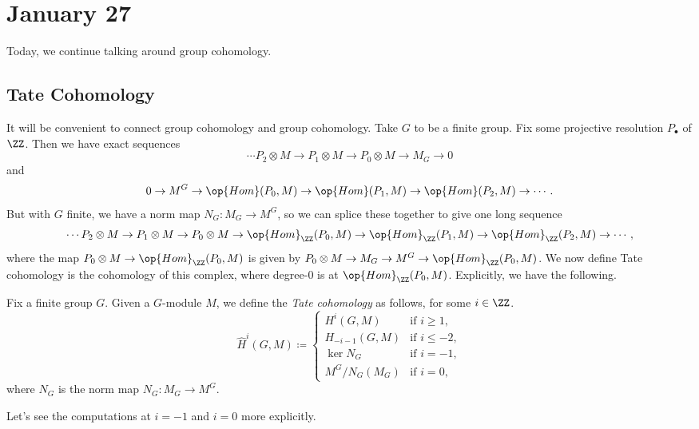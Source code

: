 \documentclass[../notes.tex]{subfiles}
\begin{document}
\section{January 27}

Today, we continue talking around group cohomology.

\subsection{Tate Cohomology}
It will be convenient to connect group cohomology and group cohomology. Take $G$ to be a finite group. Fix some projective resolution $P_\bullet$ of $\ZZ$. Then we have exact sequences
\[\cdots P_2\otimes M\to P_1\otimes M\to P_0\otimes M\to M_G\to0\]
and
\[0\to M^G\to\op{Hom}(P_0,M)\to\op{Hom}(P_1,M)\to\op{Hom}(P_2,M)\to\cdots.\]
But with $G$ finite, we have a norm map $N_G\colon M_G\to M^G$, so we can splice these together to give one long sequence
\[\cdots P_2\otimes M\to P_1\otimes M\to P_0\otimes M\to\op{Hom}_\ZZ(P_0,M)\to\op{Hom}_\ZZ(P_1,M)\to\op{Hom}_\ZZ(P_2,M)\to\cdots,\]
where the map $P_0\otimes M\to\op{Hom}_\ZZ(P_0,M)$ is given by $P_0\otimes M\to M_G\to M^G\to\op{Hom}_\ZZ(P_0,M)$. We now define Tate cohomology is the cohomology of this complex, where degree-$0$ is at $\op{Hom}_\ZZ(P_0,M)$. Explicitly, we have the following.
\begin{definition}
	Fix a finite group $G$. Given a $G$-module $M$, we define the \textit{Tate cohomology} as follows, for some $i\in\ZZ$.
	\[\widehat H^i(G,M)\coloneqq\begin{cases}
		H^i(G,M) & \text{if }i\ge1, \\
		H_{-i-1}(G,M) & \text{if }i\le-2, \\
		\ker N_G & \text{if }i=-1, \\
		M^G/N_G(M_G) & \text{if }i=0,
	\end{cases}\]
	where $N_G$ is the norm map $N_G\colon M_G\to M^G$.
\end{definition}
Let's see the computations at $i=-1$ and $i=0$ more explicitly.
\end{document}
